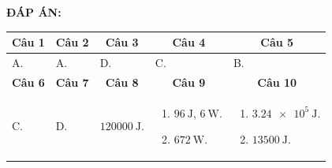\textbf{ĐÁP ÁN:}
\begin{longtable}[\textwidth]{|m{}|m{}|m{}|m{}|m{}|}
	\hline%
	\multicolumn{1}{|c}{\textbf{Câu 1}} &
	\multicolumn{1}{|c|}{\textbf{Câu 2}}& 
	\multicolumn{1}{c|}{\textbf{Câu 3}} &
	\multicolumn{1}{c|}{\textbf{Câu 4}} &
	\multicolumn{1}{c|}{\textbf{Câu 5}}  \\
	\hline
	A. &
	A. &
	D. &
	C. &
	B.\\
	\hline
	\multicolumn{1}{|c}{\textbf{Câu 6}} &
	\multicolumn{1}{|c|}{\textbf{Câu 7}}&  
	\multicolumn{1}{c|}{\textbf{Câu 8}} &
	\multicolumn{1}{c|}{\textbf{Câu 9}} &
	\multicolumn{1}{c|}{\textbf{Câu 10}} \\
	\hline
	C. &
	D. &
	$\SI{120000}{\joule}$. &
	\begin{enumerate}[label=\alph*)]
		\item $\SI{96}{\joule}$, $\SI{6}{\watt}$.
		\item $\SI{672}{\watt}$.
	\end{enumerate} &
	\begin{enumerate}[label=\alph*)]
		\item $\SI{3,24e5}{\joule}$.
		\item $\SI{13500}{\joule}$.
	\end{enumerate}\\
	\hline
\end{longtable}
